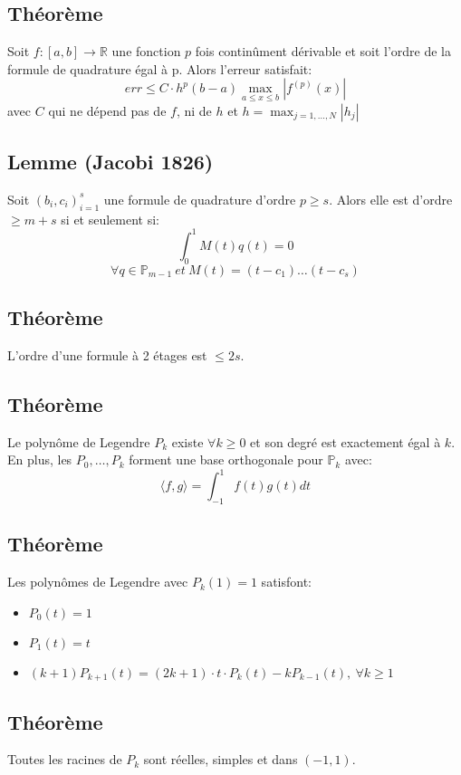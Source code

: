 \documentclass{article}
\newcommand{\R}{\mathbb{R}}
\begin{document}
\subsection{Théorème}
Soit $f: [a, b] \rightarrow \R$ une fonction $p$ fois continûment dérivable et soit l'ordre de la formule de quadrature égal à p. Alors l'erreur satisfait:
$$err \leq C \cdot h^p (b-a) \max_{a \leq x \leq b}|f^{(p)}(x)|$$
avec $C$ qui ne dépend pas de $f$, ni de $h$ et $h = \max_{j = 1, \dots, N}|h_j|$

\subsection{Lemme (Jacobi 1826)}
Soit $(b_i, c_i)_{i = 1}^{s}$ une formule de quadrature d'ordre $p \geq s$. Alors elle est d'ordre $\geq m + s$ si et seulement si:
$$\int_{0}^{1}M(t)q(t)=0$$
$$\forall q  \in \mathbb{P}_{m - 1} \ et\ M(t) = (t - c_1)\dots(t - c_s)$$

\subsection{Théorème}
L'ordre d'une formule à 2 étages est $\leq 2s$.

\subsection{Théorème}
Le polynôme de Legendre $P_k$ existe $\forall k \geq 0$ et son degré est exactement égal à $k$. En plus, les $P_0, \dots, P_k$
forment une base orthogonale pour $\mathbb{P}_k$ avec:
$$\langle f, g \rangle = \int_{-1}^{1}f(t)g(t)dt$$

\subsection{Théorème}
Les polynômes de Legendre avec $P_k(1) = 1$ satisfont:
\begin{itemize}
    \item $P_0(t) = 1$
    \item $P_1(t) = t$
    \item $(k + 1)P_{k + 1}(t) = (2k + 1)\cdot t \cdot P_k(t) - k P_{k -1}(t),\ \forall k \geq 1$
\end{itemize}

\subsection{}
\subsection{Théorème}
Toutes les racines de $P_k$ sont réelles, simples et dans $(-1, 1)$.
\end{document}
